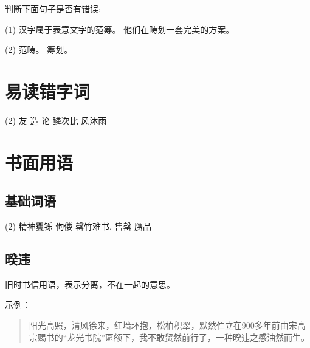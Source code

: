 \begin{question}
判断下面句子是否有错误:

\begin{tasks}(1)
  \task 汉字属于表意文字的范筹。
  \task 他们在畴划一套完美的方案。
 \end{tasks}
\end{question}
\begin{solution}
  \begin{tasks}(2)
    \task 范畴。
    \task 筹划。
   \end{tasks}
\end{solution}

\section{易读错字词}
\begin{tasks}[style=enumerate](2)
    \task 友
    \task 造
    \task {}论
    \task 鳞次比
    \task {}风沐雨
\end{tasks}



\section{书面用语}

  \subsection{基础词语}

\begin{tasks}[style=enumerate](2)
    \task 精神矍铄  
    \task 佝偻      
    \task 罄竹难书, 售罄 
    \task 赝品      
\end{tasks}

  \subsection{暌违} 
旧时书信用语，表示分离，不在一起的意思。

示例：

\begin{quotation}
  阳光高照，清风徐来，红墙环抱，松柏积翠，默然伫立在900多年前由宋高宗赐书的“龙光书院”匾额下，我不敢贸然前行了，一种暌违之感油然而生。
\end{quotation}

